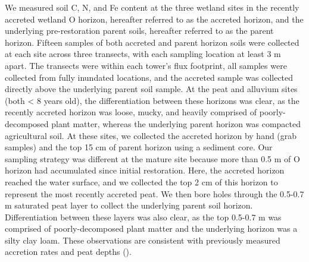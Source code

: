 \documentclass[
  12pt,
]{article}
\begin{document}
We measured soil C, N, and Fe content at the three wetland sites in the
recently accreted wetland O horizon, hereafter referred to as the
accreted horizon, and the underlying pre-restoration parent soils,
hereafter referred to as the parent horizon. Fifteen samples of both
accreted and parent horizon soils were collected at each site across
three transects, with each sampling location at least 3 m apart. The
transects were within each tower's flux footprint, all samples were
collected from fully inundated locations, and the accreted sample was
collected directly above the underlying parent soil sample. At the peat
and alluvium sites (both \textless{} 8 years old), the differentiation
between these horizons was clear, as the recently accreted horizon was
loose, mucky, and heavily comprised of poorly-decomposed plant matter,
whereas the underlying parent horizon was compacted agricultural soil.
At these sites, we collected the accreted horizon by hand (grab samples)
and the top 15 cm of parent horizon using a sediment core. Our sampling
strategy was different at the mature site because more than 0.5 m of O
horizon had accumulated since initial restoration. Here, the accreted
horizon reached the water surface, and we collected the top 2 cm of this
horizon to represent the most recently accreted peat. We then bore holes
through the 0.5-0.7 m saturated peat layer to collect the underlying
parent soil horizon. Differentiation between these layers was also
clear, as the top 0.5-0.7 m was comprised of poorly-decomposed plant
matter and the underlying horizon was a silty clay loam. These
observations are consistent with previously measured accretion rates and
peat depths ().
\end{document}
